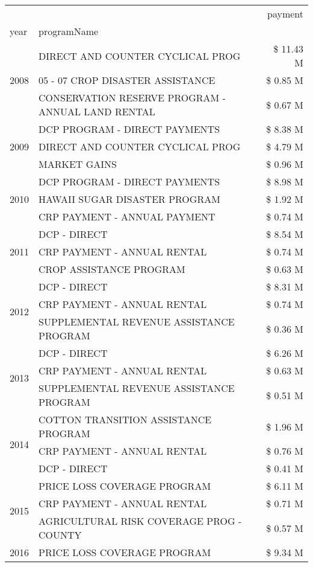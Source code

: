 \begin{tabular}{llr}
\toprule
 &  & payment \\
year & programName &  \\
\midrule
\multirow[t]{3}{*}{2008} & DIRECT AND COUNTER CYCLICAL PROG & \$ 11.43 M \\
 & 05 - 07 CROP DISASTER ASSISTANCE & \$ 0.85 M \\
 & CONSERVATION RESERVE PROGRAM - ANNUAL LAND RENTAL & \$ 0.67 M \\
\cline{1-3}
\multirow[t]{3}{*}{2009} & DCP PROGRAM - DIRECT PAYMENTS & \$ 8.38 M \\
 & DIRECT AND COUNTER CYCLICAL PROG & \$ 4.79 M \\
 & MARKET GAINS & \$ 0.96 M \\
\cline{1-3}
\multirow[t]{3}{*}{2010} & DCP PROGRAM - DIRECT PAYMENTS & \$ 8.98 M \\
 & HAWAII SUGAR DISASTER PROGRAM & \$ 1.92 M \\
 & CRP PAYMENT - ANNUAL PAYMENT & \$ 0.74 M \\
\cline{1-3}
\multirow[t]{3}{*}{2011} & DCP - DIRECT & \$ 8.54 M \\
 & CRP PAYMENT - ANNUAL RENTAL & \$ 0.74 M \\
 & CROP ASSISTANCE PROGRAM & \$ 0.63 M \\
\cline{1-3}
\multirow[t]{3}{*}{2012} & DCP - DIRECT & \$ 8.31 M \\
 & CRP PAYMENT - ANNUAL RENTAL & \$ 0.74 M \\
 & SUPPLEMENTAL REVENUE ASSISTANCE PROGRAM & \$ 0.36 M \\
\cline{1-3}
\multirow[t]{3}{*}{2013} & DCP - DIRECT & \$ 6.26 M \\
 & CRP PAYMENT - ANNUAL RENTAL & \$ 0.63 M \\
 & SUPPLEMENTAL REVENUE ASSISTANCE PROGRAM & \$ 0.51 M \\
\cline{1-3}
\multirow[t]{3}{*}{2014} & COTTON TRANSITION ASSISTANCE PROGRAM & \$ 1.96 M \\
 & CRP PAYMENT - ANNUAL RENTAL & \$ 0.76 M \\
 & DCP - DIRECT & \$ 0.41 M \\
\cline{1-3}
\multirow[t]{3}{*}{2015} & PRICE LOSS COVERAGE PROGRAM & \$ 6.11 M \\
 & CRP PAYMENT - ANNUAL RENTAL & \$ 0.71 M \\
 & AGRICULTURAL RISK COVERAGE PROG - COUNTY & \$ 0.57 M \\
\cline{1-3}
\multirow[t]{3}{*}{2016} & PRICE LOSS COVERAGE PROGRAM                   & \$ 9.34 M \\

\end{tabular}
